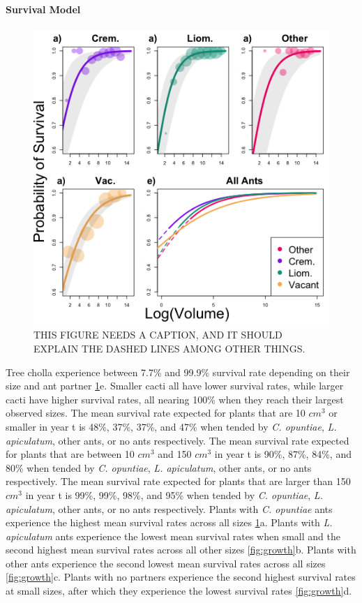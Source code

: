 \documentclass[11pt]{article}
\begin{document}
\paragraph{Survival Model}
\begin{figure}[H]
	\includegraphics[width=0.95\linewidth]{Figures/SurvivalPlot.png}
	\caption{THIS FIGURE NEEDS A CAPTION, AND IT SHOULD EXPLAIN THE DASHED LINES AMONG OTHER THINGS.}
	\label{fig:surv}
\end{figure}
Tree cholla experience between 7.7\% and 99.9\% survival rate depending on their size and ant partner \ref{fig:surv}e.
Smaller cacti all have lower survival rates, while larger cacti have higher survival rates, all nearing 100\% when they reach their largest observed sizes.
The mean survival rate expected for plants that are 10 $cm^3$ or smaller in year t is 48\%, 37\%, 37\%, and 47\% when tended by \textit{C. opuntiae}, \textit{L. apiculatum}, other ants, or no ants respectively. 
The mean survival rate expected for plants that are between 10 $cm^3$ and 150 $cm^3$ in year t is 90\%, 87\%, 84\%, and 80\% when tended by \textit{C. opuntiae}, \textit{L. apiculatum}, other ants, or no ants respectively. 
The mean survival rate expected for plants that are larger than 150 $cm^3$ in year t is 99\%, 99\%, 98\%, and 95\% when tended by \textit{C. opuntiae}, \textit{L. apiculatum}, other ants, or no ants respectively. 
Plants with \textit{C. opuntiae} ants experience the highest mean survival rates across all sizes \ref{fig:surv}a.
Plants with \textit{L. apiculatum} ants experience the lowest mean survival rates when small and the second highest mean survival rates across all other sizes \ref{fig:growth}b. 
Plants with other ants experience the second lowest mean survival rates across all sizes \ref{fig:growth}c.
Plants with no partners experience the second highest survival rates at small sizes, after which they experience the lowest survival rates \ref{fig:growth}d. 
\end{document}
